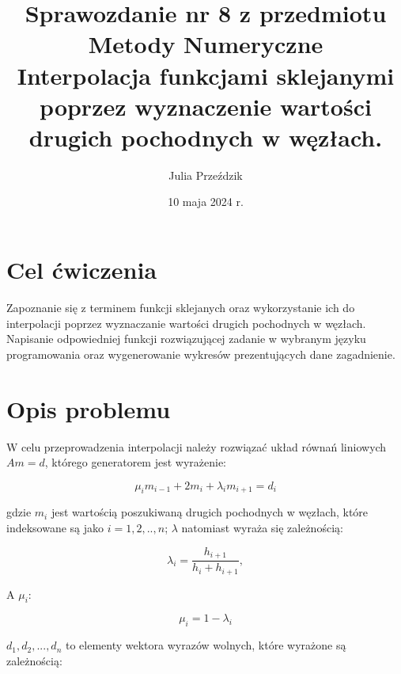 \documentclass{article}
\begin{document}
\Large

\title{\LARGE Sprawozdanie nr 8 z przedmiotu Metody Numeryczne\\
       \LARGE Interpolacja funkcjami sklejanymi poprzez wyznaczenie wartości drugich pochodnych w węzłach.}
\author{Julia Przeździk}
\date{10 maja 2024 r.}
\maketitle

\large

\section{Cel ćwiczenia}

Zapoznanie się z terminem funkcji sklejanych oraz wykorzystanie ich do interpolacji poprzez wyznaczanie wartości drugich pochodnych w węzłach. Napisanie odpowiedniej funkcji rozwiązującej zadanie w wybranym języku programowania oraz wygenerowanie wykresów prezentujących dane zagadnienie.

\section{Opis problemu}

W celu przeprowadzenia interpolacji należy rozwiązać układ równań liniowych $Am = d$, którego generatorem jest wyrażenie:

\begin{equation*}
\mu_i m_{i-1} + 2m_i + \lambda_i m_{i+1} = d_i
\end{equation*}

\noindent
gdzie $m_i$ jest wartością poszukiwaną drugich pochodnych w węzłach, które indeksowane są jako $i = 1,2,..,n$; $\lambda$ natomiast wyraża się zależnością:

\begin{equation*}
\lambda_i = \frac{h_{i+1}}{h_i + h_{i+1}},
\end{equation*}

\noindent
A $\mu_i$:

\begin{equation*}
\mu_i = 1 - \lambda_i
\end{equation*}

\noindent
$d_1, d_2,..., d_n$ to elementy wektora wyrazów wolnych, które wyrażone są zależnością:
\end{document}

